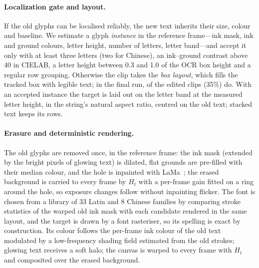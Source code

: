 \paragraph{Localization gate and layout.}
\label{sec:loc}
If the old glyphs can be localised reliably, the new text inherits their size, colour and baseline. We estimate a glyph \emph{instance} in the reference frame---ink mask, ink and ground colours, letter height, number of letters, letter band---and accept it only with at least three letters (two for Chinese), an ink--ground contrast above 40 in CIELAB, a letter height between 0.3 and 1.0 of the OCR box height and a regular row grouping. Otherwise the clip takes the \emph{box layout}, which fills the tracked box with legible text; in the final run, \rBoxPolicy{} of the \rOursCollatN{} edited clips (35\%) do. With an accepted instance the target is laid out on the letter band at the measured letter height, in the string's natural aspect ratio, centred on the old text; stacked text keeps its rows.

\paragraph{Erasure and deterministic rendering.}
\label{sec:render}
The old glyphs are removed once, in the reference frame: the ink mask (extended by the bright pixels of glowing text) is dilated, flat grounds are pre-filled with their median colour, and the hole is inpainted with LaMa~\cite{suvorov2022lama}; the erased background is carried to every frame by $H_t$ with a per-frame gain fitted on a ring around the hole, so exposure changes follow without inpainting flicker. The font is chosen from a library of 33 Latin and 8 Chinese families by comparing stroke statistics of the warped old ink mask with each candidate rendered in the same layout, and the target is drawn by a font rasteriser, so its spelling is exact by construction. Its colour follows the per-frame ink colour of the old text modulated by a low-frequency shading field estimated from the old strokes; glowing text receives a soft halo; the canvas is warped to every frame with $H_t$ and composited over the erased background.

